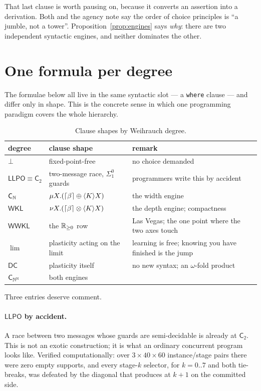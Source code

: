 That last clause is worth pausing on, because it converts an assertion into a
derivation. Both \cite{ChoiceScheduling} and the agency note say the order of
choice principles is ``a jumble, not a tower''. Proposition~\ref{prop:engines}
says \emph{why}: there are two independent syntactic engines, and neither
dominates the other.

\section{One formula per degree}
\label{sec:formulae}

The formulae below all live in the same syntactic slot --- a \texttt{where}
clause --- and differ only in shape. This is the concrete sense in which one
programming paradigm covers the whole hierarchy.

\begin{table}[h]
\centering
\small
\renewcommand{\arraystretch}{1.35}
\begin{tabular}{@{}llp{7.1cm}@{}}
\toprule
degree & clause shape & remark \\
\midrule
$\bot$ & fixed-point-free & no choice demanded \\
$\mathsf{LLPO} \equiv \mathsf{C}_{2}$ & two-message race, $\Sigma^{0}_{1}$ guards
  & \rhoc{} programmers write this by accident \\
$\mathsf{C}_{\mathbb{N}}$ & $\mu X.(\lceil\beta\rceil \oplus \langle K\rangle X)$
  & the width engine \\
$\mathsf{WKL}$ & $\nu X.(\lceil\beta\rceil \otimes \langle K\rangle X)$
  & the depth engine; compactness \\
$\mathsf{WWKL}$ & the $\mathbb{R}_{\ge0}$ row & Las Vegas; the one point where the two
  axes touch \\
$\lim$ & plasticity acting on the limit
  & learning is free; knowing you have finished is the jump \\
$\mathsf{DC}$ & plasticity itself & no new syntax; an $\omega$-fold product \\
$\mathsf{C}_{\mathbb{N}^{\mathbb{N}}}$ & both engines & \\
\bottomrule
\end{tabular}
\caption{Clause shapes by Weihrauch degree.}
\label{tab:degrees}
\end{table}

Three entries deserve comment.

\paragraph{$\mathsf{LLPO}$ by accident.} A race between two messages whose guards
are semi-decidable is already at $\mathsf{C}_{2}$. This is not an exotic
construction; it is what an ordinary concurrent program looks like. Verified
computationally: over $3 \times 40 \times 60$ instance/stage pairs there were zero
empty supports, and every stage-$k$ selector, for $k = 0..7$ and both tie-breaks,
was defeated by the diagonal that produces at $k{+}1$ on the committed side.

